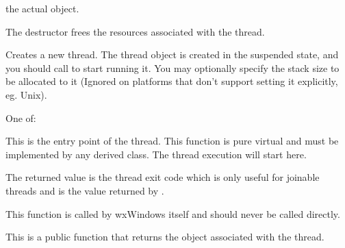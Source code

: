 

the actual  object.



The destructor frees the resources associated with the thread.

\label{wxthreadhelpercreate}


Creates a new thread. The thread object is created in the suspended state, and you
should call  to start running
it.  You may optionally specify the stack size to be allocated to it (Ignored on
platforms that don't support setting it explicitly, eg. Unix).


One of:

\twocolwidtha{7cm}
\begin{twocollist}\itemsep=0pt
\end{twocollist}

\label{wxthreadhelperentry}


This is the entry point of the thread. This function is pure virtual and must
be implemented by any derived class. The thread execution will start here.

The returned value is the thread exit code which is only useful for
joinable threads and is the value returned by
.

This function is called by wxWindows itself and should never be called
directly.

\label{wxthreadhelpergetthread}


This is a public function that returns the  object
associated with the thread.

